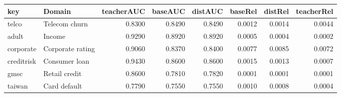 \begin{tabular}{llrrrrrr}
\toprule
key & Domain & teacherAUC & baseAUC & distAUC & baseRel & distRel & teacherRel \\
\midrule
telco & Telecom churn & 0.8300 & 0.8490 & 0.8490 & 0.0012 & 0.0014 & 0.0044 \\
adult & Income & 0.9290 & 0.8920 & 0.8920 & 0.0005 & 0.0004 & 0.0002 \\
corporate & Corporate rating & 0.9060 & 0.8370 & 0.8400 & 0.0077 & 0.0085 & 0.0072 \\
creditrisk & Consumer loan & 0.9430 & 0.8600 & 0.8600 & 0.0015 & 0.0013 & 0.0007 \\
gmsc & Retail credit & 0.8600 & 0.7810 & 0.7820 & 0.0001 & 0.0001 & 0.0001 \\
taiwan & Card default & 0.7790 & 0.7550 & 0.7550 & 0.0010 & 0.0008 & 0.0004 \\
\bottomrule
\end{tabular}
